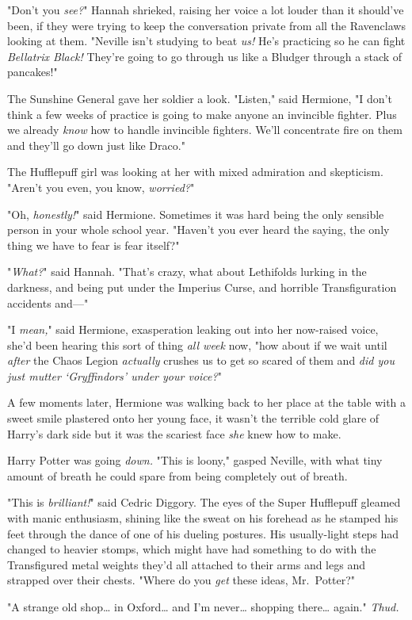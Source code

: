 "Don't you \emph{see?}" Hannah shrieked, raising her voice a lot louder than it
should've been, if they were trying to keep the conversation private from all
the Ravenclaws looking at them. "Neville isn't studying to beat \emph{us!} He's
practicing so he can fight \emph{Bellatrix Black!} They're going to go through
us like a Bludger through a stack of pancakes!"

The Sunshine General gave her soldier a look. "Listen," said Hermione, "I don't
think a few weeks of practice is going to make anyone an invincible fighter.
Plus we already \emph{know} how to handle invincible fighters. We'll
concentrate fire on them and they'll go down just like Draco."

The Hufflepuff girl was looking at her with mixed admiration and skepticism.
"Aren't you even, you know, \emph{worried?}"

"Oh, \emph{honestly!}" said Hermione. Sometimes it was hard being the only
sensible person in your whole school year. "Haven't you ever heard the saying,
the only thing we have to fear is fear itself?"

"\emph{What?}" said Hannah. "That's crazy, what about Lethifolds lurking in the
darkness, and being put under the Imperius Curse, and horrible Transfiguration
accidents and---"

"I \emph{mean,}" said Hermione, exasperation leaking out into her now-raised
voice, she'd been hearing this sort of thing \emph{all week} now, "how about if
we wait until \emph{after} the Chaos Legion \emph{actually} crushes us to get
so scared of them and \emph{did you just mutter `Gryffindors' under your
voice?}"

A few moments later, Hermione was walking back to her place at the table with a
sweet smile plastered onto her young face, it wasn't the terrible cold glare of
Harry's dark side but it was the scariest face \emph{she} knew how to make.

Harry Potter was going \emph{down.}
\later
"This is loony," gasped Neville, with what tiny amount of breath he could spare
from being completely out of breath.

"This is \emph{brilliant!}" said Cedric Diggory. The eyes of the Super
Hufflepuff gleamed with manic enthusiasm, shining like the sweat on his
forehead as he stamped his feet through the dance of one of his dueling
postures. His usually-light steps had changed to heavier stomps, which might
have had something to do with the Transfigured metal weights they'd all
attached to their arms and legs and strapped over their chests. "Where do you
\emph{get} these ideas, Mr.~Potter?"

"A strange old shop{\ldots} in Oxford{\ldots} and I'm never{\ldots} shopping
there{\ldots} again." \emph{Thud.}
